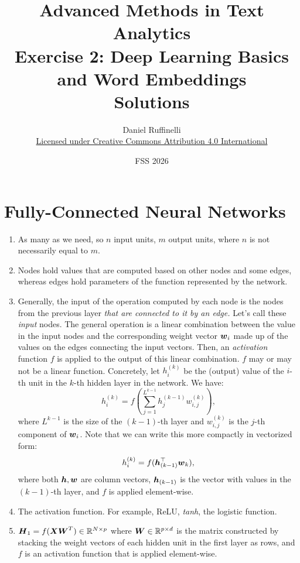 \documentclass[11pt,a4paper]{article}
\title{Advanced Methods in Text Analytics \\ 
Exercise 2: Deep Learning Basics and Word Embeddings \\ 
\textbf{Solutions}}
\author{Daniel Ruffinelli \\ \href{https://creativecommons.org/licenses/by/4.0/}{Licensed under Creative Commons Attribution 4.0 International}}
\date{FSS 2026}
\begin{document}
\maketitle

\section{Fully-Connected Neural Networks}

\begin{enumerate}[label=(\alph*)]
    \item As many as we need, so $n$ input units, $m$ output units, where $n$ is
          not necessarily equal to $m$.
    \item Nodes hold values that are computed based on other nodes and some
          edges, whereas edges hold parameters of the function represented by
          the network.
    \item Generally, the input of the operation computed by each node is the
          nodes from the previous layer
          \emph{that are connected to it by an edge.}
          Let's call these \emph{input} nodes.
          The general operation is a linear combination between the value in the
          input nodes and the corresponding weight vector ${\boldsymbol{w}}_i$ made up of the
          values on the edges connecting the input vectors.
          Then, an \emph{activation} function $f$ is applied to the output of
          this linear combination.
          $f$ may or may not be a linear function.
          Concretely, let $h_i^{(k)}$ be the (output) value of the $i$-th unit
          in the $k$-th hidden layer in the network.
          We have:
          \begin{equation*}
              h^{(k)}_i = f\left(\sum_{j=1}^{L^{k-1}}{h_j^{(k-1)} w_{i,j}^{(k)}}\right),
          \end{equation*}
          where $L^{k-1}$ is the size of the $(k-1)$-th layer and
          $w_{i,j}^{(k)}$ is the $j$-th component of ${\boldsymbol{w}}_i$.
          Note that we can write this more compactly in vectorized form:
          \begin{equation*}
              h^{(k)}_i = f({\boldsymbol{h}}_{(k-1)}^\top{\boldsymbol{w}}_k),
          \end{equation*}
          where both ${\boldsymbol{h}},{\boldsymbol{w}}$ are column vectors, ${\boldsymbol{h}}_{(k-1)}$ is the vector
          with values in the $(k-1)$-th layer, and $f$ is applied element-wise.
    \item The activation function. For example, ReLU, \emph{tanh}, the
          logistic function.
    \item ${\boldsymbol{H}}_1=f({\boldsymbol{X}}{\boldsymbol{W}}^T)\in\mathbb{R}^{N\times p}$ where
          ${\boldsymbol{W}}\in\mathbb{R}^{p\times d}$ is the matrix constructed by stacking the
          weight vectors of each hidden unit in the first layer as rows, and $f$
          is an activation function that is applied element-wise.
\end{enumerate}
\end{document}
